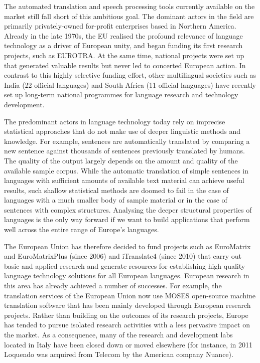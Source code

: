 \documentclass[]{../../metanetpaper}
\begin{document}
\begin{multicols}{2}
The automated translation and speech processing tools currently available on
the market still fall short of this ambitious goal. The dominant actors in the
field are primarily privately-owned for-profit enterprises based in Northern
America. Already in the late 1970s, the EU realised the profound relevance of
language technology as a driver of European unity, and began funding its first
research projects, such as EUROTRA. At the same time, national projects were
set up that generated valuable results but never led to concerted European
action. In contrast to this highly selective funding effort, other
multilingual societies such as India (22 official languages) and South Africa
(11 official languages) have recently set up long-term national programmes for
language research and technology development.

The predominant actors in language technology today rely on imprecise statistical approaches
that do not make use of deeper linguistic methods and knowledge. For example,
sentences are automatically translated by comparing a new sentence against
thousands of sentences previously translated by humans. The quality of the
output largely depends on the amount and quality of the available sample
corpus. While the automatic translation of simple sentences in languages with
sufficient amounts of available text material can achieve useful results, such
shallow statistical methods are doomed to fail in the case of languages with a
much smaller body of sample material or in the case of sentences with complex
structures. Analysing
the deeper structural properties of languages is the only way forward if we
want to build applications that perform well across the entire range of
Europe's languages. 


The European Union has therefore decided to fund projects such as EuroMatrix
and EuroMatrixPlus (since 2006) and iTranslate4 (since 2010) that carry out
basic and applied research and generate resources for establishing high
quality language technology solutions for all European languages. European
research in this area has already achieved a number of successes. For
example, the translation services of the European Union now use MOSES
open-source machine translation software that has been mainly developed
through European research projects. Rather
than building on the outcomes of its research projects, Europe has tended to
pursue isolated research activities with a less pervasive impact on the
market. As a consequence, many of the research and development labs located in Italy
have been closed down or moved elsewhere (for instance, in 2011 Loquendo was
acquired from Telecom by the American company Nuance). 


\end{multicols}
\end{document}
